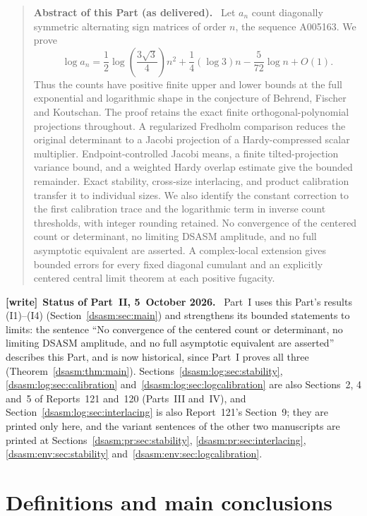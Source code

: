 \documentclass[11pt,letterpaper]{article}
\theoremstyle{remark}\newtheorem{remark}[theorem]{Remark}
\newenvironment{writenote}[1][]{\par\smallskip\begingroup\small
 \noindent\textbf{[write]}\if\relax\detokenize{#1}\relax\else~\textbf{#1.}\fi\ }%
 {\par\endgroup\smallskip}
\newenvironment{partabstract}{\begin{quote}\small\noindent\textbf{Abstract of this Part (as delivered).}\ }{\end{quote}}
\begin{document}
\begin{partabstract}
Let $a_n$ count diagonally symmetric alternating sign matrices of order
$n$, the sequence A005163. We prove
\[
 \log a_n=\frac12\log\!\left(\frac{3\sqrt3}{4}\right)n^2
       +\frac14(\log3)n-\frac5{72}\log n+O(1).
\]
Thus the counts have positive finite upper and lower bounds at the
full exponential and logarithmic shape in the conjecture of
Behrend, Fischer and Koutschan. The proof retains the exact finite
orthogonal-polynomial projections throughout. A regularized Fredholm
comparison reduces the original determinant to a Jacobi projection
of a Hardy-compressed scalar multiplier. Endpoint-controlled Jacobi
means, a finite tilted-projection variance bound, and a weighted
Hardy overlap estimate give the bounded remainder. Exact stability,
cross-size interlacing, and product calibration transfer it to
individual sizes. We also identify the constant correction to the
first calibration trace and the logarithmic term in inverse count
thresholds, with integer rounding retained. No convergence of the
centered count or determinant, no limiting DSASM amplitude, and no
full asymptotic equivalent are asserted. A complex-local extension gives
bounded errors for every fixed diagonal cumulant and an explicitly
centered central limit theorem at each positive fugacity.
\end{partabstract}
\begin{writenote}[Status of Part~II, 5~October 2026]
Part~I uses this Part's results (I1)--(I4) (Section~\ref{dsasm:sec:main}) and strengthens its bounded statements to limits: the sentence ``No convergence of the centered count or determinant, no limiting DSASM amplitude, and no full asymptotic equivalent are asserted'' describes this Part, and is now historical, since Part~I proves all three (Theorem~\ref{dsasm:thm:main}). Sections~\ref{dsasm:log:sec:stability}, \ref{dsasm:log:sec:calibration} and~\ref{dsasm:log:sec:logcalibration} are also Sections~2, 4 and~5 of Reports~121 and~120 (Parts~III and~IV), and Section~\ref{dsasm:log:sec:interlacing} is also Report~121's Section~9; they are printed only here, and the variant sentences of the other two manuscripts are printed at Sections~\ref{dsasm:pr:sec:stability}, \ref{dsasm:pr:sec:interlacing}, \ref{dsasm:env:sec:stability} and~\ref{dsasm:env:sec:logcalibration}.
\end{writenote}
\section{Definitions and main conclusions}\label{dsasm:log:sec:main}
\end{document}
